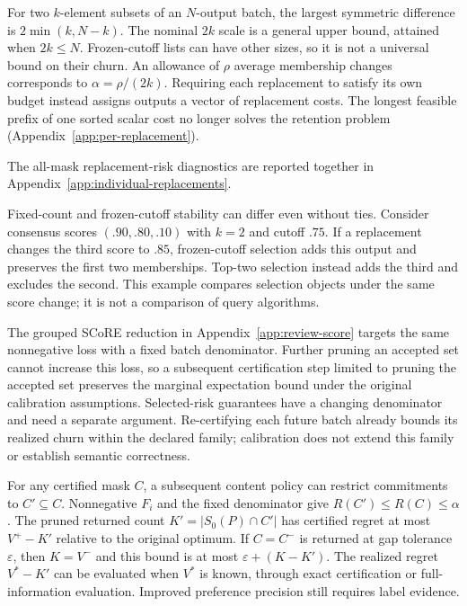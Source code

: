 For two $k$-element subsets of an $N$-output batch, the largest symmetric difference is $2\min(k,N-k)$. The nominal $2k$ scale is a general upper bound, attained when $2k\le N$. Frozen-cutoff lists can have other sizes, so it is not a universal bound on their churn. An allowance of $\rho$ average membership changes corresponds to $\alpha=\rho/(2k)$. Requiring each replacement to satisfy its own budget instead assigns outputs a vector of replacement costs. The longest feasible prefix of one sorted scalar cost no longer solves the retention problem (Appendix~\ref{app:per-replacement}).

The all-mask replacement-risk diagnostics are reported together in Appendix~\ref{app:individual-replacements}.

Fixed-count and frozen-cutoff stability can differ even without ties. Consider consensus scores $(.90,.80,.10)$ with $k=2$ and cutoff $.75$. If a replacement changes the third score to $.85$, frozen-cutoff selection adds this output and preserves the first two memberships. Top-two selection instead adds the third and excludes the second. This example compares selection objects under the same score change; it is not a comparison of query algorithms. 

The grouped SCoRE reduction in Appendix~\ref{app:review-score} targets the same nonnegative loss with a fixed batch denominator. Further pruning an accepted set cannot increase this loss, so a subsequent certification step limited to pruning the accepted set preserves the marginal expectation bound under the original calibration assumptions. Selected-risk guarantees have a changing denominator and need a separate argument. Re-certifying each future batch already bounds its realized churn within the declared family; calibration does not extend this family or establish semantic correctness.

For any certified mask $C$, a subsequent content policy can restrict commitments to $C'\subseteq C$. Nonnegative $F_i$ and the fixed denominator give $R(C')\le R(C)\le\alpha$. The pruned returned count $K'=|S_0(P)\cap C'|$ has certified regret at most $V^+-K'$ relative to the original optimum. If $C=C^-$ is returned at gap tolerance $\varepsilon$, then $K=V^-$ and this bound is at most $\varepsilon+(K-K')$. The realized regret $V^*-K'$ can be evaluated when $V^*$ is known, through exact certification or full-information evaluation. Improved preference precision still requires label evidence.

